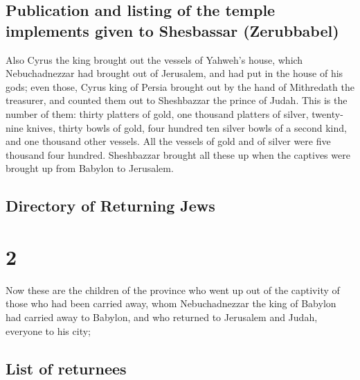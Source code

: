 \hypertarget{publication-and-listing-of-the-temple-implements-given-to-shesbassar-zerubbabel}{%
\subsection{Publication and listing of the temple implements given to
Shesbassar
(Zerubbabel)}\label{publication-and-listing-of-the-temple-implements-given-to-shesbassar-zerubbabel}}

 Also Cyrus the king brought out the vessels of Yahweh's
house, which Nebuchadnezzar had brought out of Jerusalem, and had put in
the house of his gods;  even those, Cyrus king of Persia
brought out by the hand of Mithredath the treasurer, and counted them
out to Sheshbazzar the prince of Judah.  This is the
number of them: thirty platters of gold, one thousand platters of
silver, twenty-nine knives,  thirty bowls of gold, four
hundred ten silver bowls of a second kind, and one thousand other
vessels.  All the vessels of gold and of silver were five
thousand four hundred. Sheshbazzar brought all these up when the
captives were brought up from Babylon to Jerusalem.

\hypertarget{directory-of-returning-jews}{%
\subsection{Directory of Returning
Jews}\label{directory-of-returning-jews}}

\hypertarget{section-1}{%
\section{2}\label{section-1}}

 Now these are the children of the province who went up
out of the captivity of those who had been carried away, whom
Nebuchadnezzar the king of Babylon had carried away to Babylon, and who
returned to Jerusalem and Judah, everyone to his city;

\hypertarget{list-of-returnees}{%
\subsection{List of returnees}\label{list-of-returnees}}

